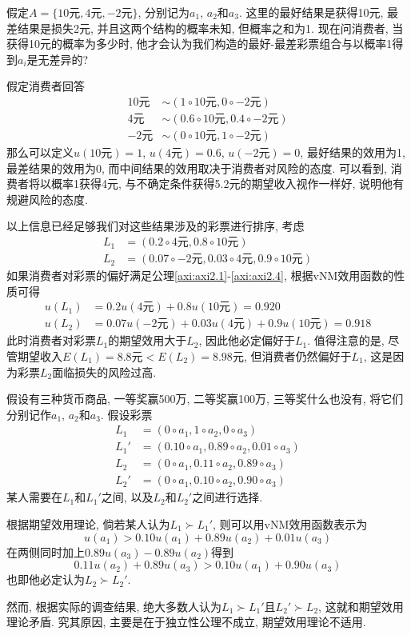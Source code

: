 \documentclass[cn, 12pt, math=mtpro2, bibstyle=apa, blue]{elegantbook}
\begin{document}
\begin{example}\label{exp:exp2.1}
假定$A=\{10\text{元},4\text{元},-2\text{元}\}$, 分别记为$a_1$, $a_2$和$a_3$. 这里的最好结果是获得10元, 最差结果是损失2元, 并且这两个结构的概率未知, 但概率之和为1. 现在问消费者, 当获得10元的概率为多少时, 他才会认为我们构造的最好-最差彩票组合与以概率1得到$a_i$是无差异的?

假定消费者回答
\begin{align*}
10\text{元}&\sim (1\circ 10\text{元}, 0\circ -2\text{元}) \\
4\text{元}&\sim (0.6\circ 10\text{元}, 0.4\circ -2\text{元}) \\
-2\text{元}&\sim (0\circ 10\text{元}, 1\circ -2\text{元})
\end{align*}
那么可以定义$u(10\text{元})=1$, $u(4\text{元})=0.6$, $u(-2\text{元})=0$, 最好结果的效用为1, 最差结果的效用为0, 而中间结果的效用取决于消费者对风险的态度. 可以看到, 消费者将以概率1获得4元, 与不确定条件获得5.2元的期望收入视作一样好, 说明他有规避风险的态度.

以上信息已经足够我们对这些结果涉及的彩票进行排序, 考虑
\begin{align*}
L_1&=(0.2\circ 4\text{元}, 0.8\circ 10\text{元}) \\
L_2&=(0.07\circ -2\text{元}, 0.03\circ 4\text{元}, 0.9\circ 10\text{元})
\end{align*}
如果消费者对彩票的偏好满足公理\ref{axi:axi2.1}-\ref{axi:axi2.4}, 根据vNM效用函数的性质可得
\begin{align*}
u(L_1)&=0.2u(4\text{元})+0.8u(10\text{元})=0.920 \\
u(L_2)&=0.07u(-2\text{元})+0.03u(4\text{元})+0.9u(10\text{元})=0.918
\end{align*}
此时消费者对彩票$L_1$的期望效用大于$L_2$, 因此他必定偏好于$L_1$. 值得注意的是, 尽管期望收入$E(L_1)=8.8\text{元}<E(L_2)=8.98\text{元}$, 但消费者仍然偏好于$L_1$, 这是因为彩票$L_2$面临损失的风险过高.
\end{example}

\begin{example}[$\,$Allais悖论]
假设有三种货币商品, 一等奖赢500万, 二等奖赢100万, 三等奖什么也没有, 将它们分别记作$a_1$, $a_2$和$a_3$. 假设彩票
\begin{align*}
L_1&=(0\circ a_1, 1\circ a_2, 0\circ a_3) \\
L_1'&=(0.10\circ a_1,0.89\circ a_2, 0.01\circ a_3) \\
L_2&=(0\circ a_1, 0.11\circ a_2, 0.89\circ a_3) \\
L_2'&=(0\circ a_1, 0.10\circ a_2, 0.90\circ a_3)
\end{align*}
某人需要在$L_1$和$L_1'$之间, 以及$L_2$和$L_2'$之间进行选择. 

根据期望效用理论, 倘若某人认为$L_1\succ L_1'$, 则可以用vNM效用函数表示为
$$u(a_1)>0.10u(a_1)+0.89u(a_2)+0.01u(a_3)$$
在两侧同时加上$0.89u(a_3)-0.89u(a_2)$得到
$$0.11u(a_2)+0.89u(a_3)>0.10u(a_1)+0.90u(a_3)$$
也即他必定认为$L_2\succ L_2'$. 

然而, 根据实际的调查结果, 绝大多数人认为$L_1\succ L_1'$且$L_2'\succ L_2$, 这就和期望效用理论矛盾. 究其原因, 主要是在于独立性公理不成立, 期望效用理论不适用.

\end{example}
\end{document}
